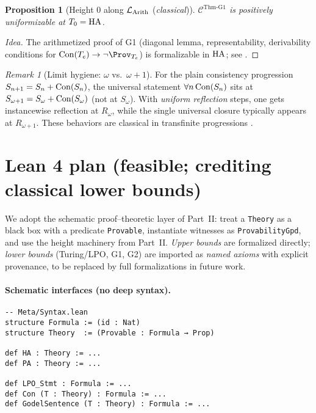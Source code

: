 \documentclass[11pt]{article}
\newtheorem{proposition}[theorem]{Proposition}
\theoremstyle{definition}
\theoremstyle{remark}
\newtheorem{remark}[theorem]{Remark}
\begin{document}
\begin{proposition}[Height \(0\) along \(\mathcal{L}_{\mathrm{Arith}}\) (\emph{classical})]\label{III:prop:G1-schema-height0}
\(\mathcal C^{\mathrm{Thm\mbox{-}G1}}\) is positively uniformizable at \(T_0=\mathrm{HA}\).
\end{proposition}

\begin{proof}[Idea]
The arithmetized proof of G1 (diagonal lemma, representability, derivability conditions for
\(\Con(T_e)\to \neg \Prov_{T_e}\)) is formalizable in \(\mathrm{HA}\); see \cite{HajekPudlak}.
\end{proof}

\begin{remark}[Limit hygiene: \(\omega\) vs.\ \(\omega{+}1\)]
For the plain consistency progression \(S_{n+1}=S_n+\mathrm{Con}(S_n)\), the universal statement
\(\forall n\,\mathrm{Con}(S_n)\) sits at \(S_{\omega+1}=S_\omega+\mathrm{Con}(S_\omega)\) (not at \(S_\omega\)).
With \emph{uniform reflection} steps, one gets instancewise reflection at \(R_\omega\),
while the single universal closure typically appears at \(R_{\omega+1}\).
These behaviors are classical in transfinite progressions \cite{Feferman1962}.
\end{remark}

\section{Lean 4 plan (feasible; crediting classical lower bounds)}

We adopt the schematic proof--theoretic layer of Part~II: treat a \texttt{Theory}
as a black box with a predicate \texttt{Provable}, instantiate witnesses as
\texttt{ProvabilityGpd}, and use the height machinery from Part~II.
\emph{Upper bounds} are formalized directly; \emph{lower bounds} (Turing/LPO, G1, G2)
are imported as \emph{named axioms} with explicit provenance, to be replaced by full
formalizations in future work.

\paragraph{Schematic interfaces (no deep syntax).}
\begin{verbatim}
-- Meta/Syntax.lean
structure Formula := (id : Nat)
structure Theory  := (Provable : Formula → Prop)

def HA : Theory := ...
def PA : Theory := ...

def LPO_Stmt : Formula := ...
def Con (T : Theory) : Formula := ...
def GodelSentence (T : Theory) : Formula := ...
\end{verbatim}
\end{document}
